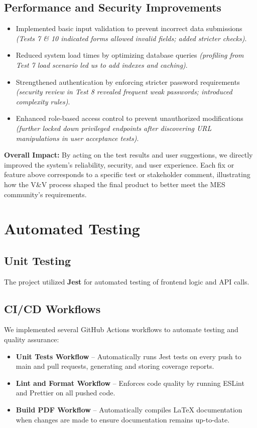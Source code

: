 \documentclass[12pt, titlepage]{article}
\begin{document}
\subsection{Performance and Security Improvements}
\begin{itemize}
  \item Implemented basic input validation to prevent incorrect data submissions 
  \emph{(Tests 7 \& 10 indicated forms allowed invalid fields; 
  added stricter checks)}.
  \item Reduced system load times by optimizing database queries 
  \emph{(profiling from Test 7 load scenario led us to add indexes and 
  caching)}.
  \item Strengthened authentication by enforcing stricter password requirements 
  \emph{(security review in Test 8 revealed frequent weak passwords; 
  introduced complexity rules)}.
  \item Enhanced role-based access control to prevent unauthorized modifications 
  \emph{(further locked down privileged endpoints after discovering URL 
  manipulations in user acceptance tests)}.
\end{itemize}

\noindent
\textbf{Overall Impact:} 
By acting on the test results and user suggestions, we directly improved the
system’s reliability, security, and user experience. Each fix or feature
above corresponds to a specific test or stakeholder comment, illustrating 
how the V\&V process shaped the final product to better meet the MES 
community’s requirements.

\section{Automated Testing}

\subsection*{Unit Testing}
The project utilized \textbf{Jest} for automated testing of frontend logic and API calls.

\subsection*{CI/CD Workflows}
We implemented several GitHub Actions workflows to automate testing and quality assurance:

\begin{itemize}
    \item \textbf{Unit Tests Workflow} -- Automatically runs Jest tests on every push to main and pull requests, generating and storing coverage reports.
    \item \textbf{Lint and Format Workflow} -- Enforces code quality by running ESLint and Prettier on all pushed code.
    \item \textbf{Build PDF Workflow} -- Automatically compiles LaTeX documentation when changes are made to ensure documentation remains up-to-date.
\end{itemize}
\end{document}
